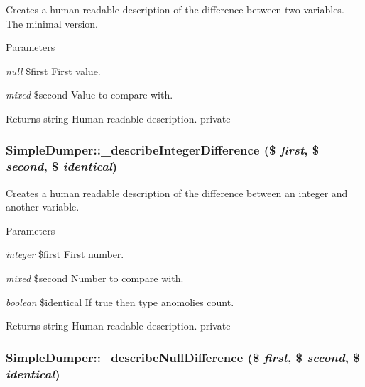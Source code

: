 \label{class_simple_dumper_a34d972570eebff32d2bf3ac5486be532}
Creates a human readable description of the difference between two variables. The minimal version. 
\begin{DoxyParams}{Parameters}
\item[{\em null}]\$first First value. \item[{\em mixed}]\$second Value to compare with. \end{DoxyParams}
\begin{DoxyReturn}{Returns}
string Human readable description.  private 
\end{DoxyReturn}
\hypertarget{class_simple_dumper_a8c66c59f6d285144cafdc6a98b47beb8}{
\subsubsection[{\_\-describeIntegerDifference}]{\setlength{\rightskip}{0pt plus 5cm}SimpleDumper::\_\-describeIntegerDifference (\$ {\em first}, \/  \$ {\em second}, \/  \$ {\em identical})}}
\label{class_simple_dumper_a8c66c59f6d285144cafdc6a98b47beb8}
Creates a human readable description of the difference between an integer and another variable. 
\begin{DoxyParams}{Parameters}
\item[{\em integer}]\$first First number. \item[{\em mixed}]\$second Number to compare with. \item[{\em boolean}]\$identical If true then type anomolies count. \end{DoxyParams}
\begin{DoxyReturn}{Returns}
string Human readable description.  private 
\end{DoxyReturn}
\hypertarget{class_simple_dumper_a435904932e367610ff8d534b0c7fead0}{
\subsubsection[{\_\-describeNullDifference}]{\setlength{\rightskip}{0pt plus 5cm}SimpleDumper::\_\-describeNullDifference (\$ {\em first}, \/  \$ {\em second}, \/  \$ {\em identical})}}
\label{class_simple_dumper_a435904932e367610ff8d534b0c7fead0}
